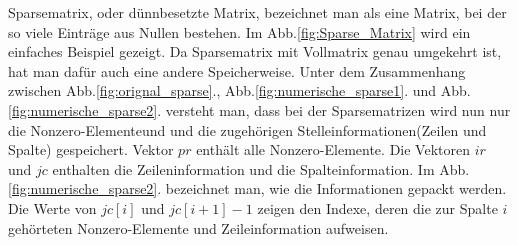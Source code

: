 
Sparsematrix, oder dünnbesetzte Matrix,  bezeichnet man als eine Matrix, bei der so viele Einträge aus Nullen bestehen. Im Abb.\ref{fig:Sparse_Matrix} wird ein einfaches Beispiel gezeigt.
Da Sparsematrix mit Vollmatrix genau umgekehrt ist, hat man dafür auch eine andere Speicherweise. Unter dem Zusammenhang zwischen Abb.\ref{fig:orignal_sparse}., Abb.\ref{fig:numerische_sparse1}. und Abb.\ref{fig:numerische_sparse2}. versteht man, dass bei der Sparsematrizen wird nun nur die Nonzero-Elementeund und die zugehörigen Stelleinformationen(Zeilen und Spalte) gespeichert. Vektor $pr$ enthält alle Nonzero-Elemente. Die Vektoren $ir$ und $jc$ enthalten die Zeileninformation und die Spalteinformation. Im Abb.\ref{fig:numerische_sparse2}. bezeichnet man, wie die Informationen gepackt werden. Die Werte von $jc[i]$ und $jc[i+1]-1$ zeigen den Indexe, deren die zur Spalte $i$  gehörteten Nonzero-Elemente und Zeileinformation aufweisen.



